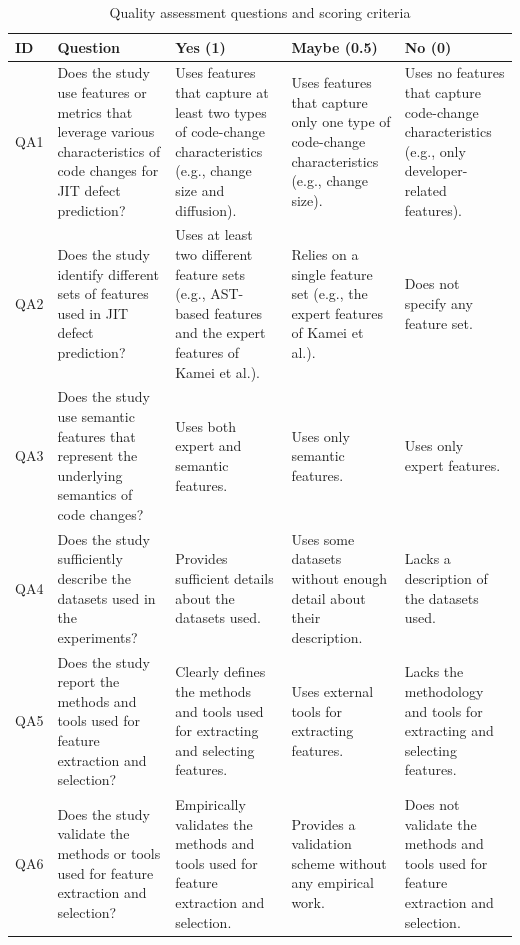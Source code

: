 \documentclass[sigconf,review]{acmart}
\begin{document}
\begin{table}[t]
    \centering
    \footnotesize
    \setlength{\tabcolsep}{4pt}
    \caption{Quality assessment questions and scoring criteria}
    \label{tab:quality-assessment}
    \begin{tabular}{@{}p{}p{}p{}p{}p{}@{}}
        \toprule
        \textbf{ID} & \textbf{Question} & \textbf{Yes (1)} & \textbf{Maybe (0.5)} & \textbf{No (0)} \\
        \midrule
        QA1 & Does the study use features or metrics that leverage various characteristics of code changes for JIT defect prediction? & Uses features that capture at least two types of code-change characteristics (e.g., change size and diffusion). & Uses features that capture only one type of code-change characteristics (e.g., change size). & Uses no features that capture code-change characteristics (e.g., only developer-related features). \\
        QA2 & Does the study identify different sets of features used in JIT defect prediction? & Uses at least two different feature sets (e.g., AST-based features and the expert features of Kamei et al.). & Relies on a single feature set (e.g., the expert features of Kamei et al.). & Does not specify any feature set. \\
        QA3 & Does the study use semantic features that represent the underlying semantics of code changes? & Uses both expert and semantic features. & Uses only semantic features. & Uses only expert features. \\
        QA4 & Does the study sufficiently describe the datasets used in the experiments? & Provides sufficient details about the datasets used. & Uses some datasets without enough detail about their description. & Lacks a description of the datasets used. \\
        QA5 & Does the study report the methods and tools used for feature extraction and selection? & Clearly defines the methods and tools used for extracting and selecting features. & Uses external tools for extracting features. & Lacks the methodology and tools for extracting and selecting features. \\
        QA6 & Does the study validate the methods or tools used for feature extraction and selection? & Empirically validates the methods and tools used for feature extraction and selection. & Provides a validation scheme without any empirical work. & Does not validate the methods and tools used for feature extraction and selection. \\

\end{tabular}
\end{table}
\end{document}
